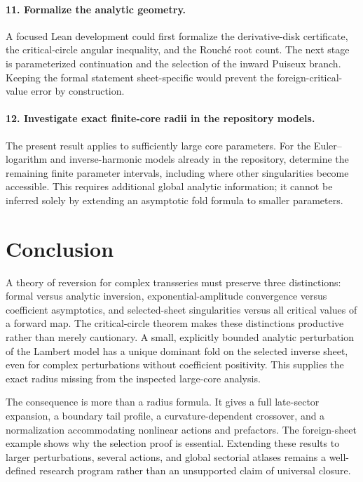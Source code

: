 \documentclass[11pt,a4paper]{article}
\numberwithin{equation}{section}
\theoremstyle{definition}
\theoremstyle{remark}
\begin{document}
\paragraph{11. Formalize the analytic geometry.}
A focused Lean development could first formalize the derivative-disk certificate, the critical-circle angular inequality, and the Rouch\'e root count. The next stage is parameterized continuation and the selection of the inward Puiseux branch. Keeping the formal statement sheet-specific would prevent the foreign-critical-value error by construction.

\paragraph{12. Investigate exact finite-core radii in the repository models.}
The present result applies to sufficiently large core parameters. For the Euler--logarithm and inverse-harmonic models already in the repository, determine the remaining finite parameter intervals, including where other singularities become accessible. This requires additional global analytic information; it cannot be inferred solely by extending an asymptotic fold formula to smaller parameters.

\section{Conclusion}
A theory of reversion for complex transseries must preserve three distinctions: formal versus analytic inversion, exponential-amplitude convergence versus coefficient asymptotics, and selected-sheet singularities versus all critical values of a forward map. The critical-circle theorem makes these distinctions productive rather than merely cautionary. A small, explicitly bounded analytic perturbation of the Lambert model has a unique dominant fold on the selected inverse sheet, even for complex perturbations without coefficient positivity. This supplies the exact radius missing from the inspected large-core analysis.

The consequence is more than a radius formula. It gives a full late-sector expansion, a boundary tail profile, a curvature-dependent crossover, and a normalization accommodating nonlinear actions and prefactors. The foreign-sheet example shows why the selection proof is essential. Extending these results to larger perturbations, several actions, and global sectorial atlases remains a well-defined research program rather than an unsupported claim of universal closure.
\end{document}
